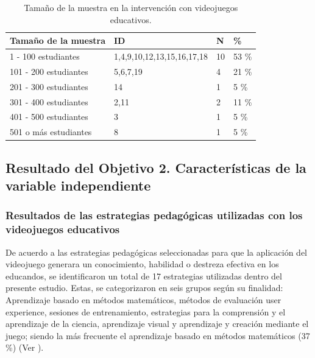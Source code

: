 \documentclass[spanish]{textolivre}
\begin{document}
\begin{table}[htbp]
\caption{Tamaño de la muestra en la intervención con videojuegos educativos.}
\label{tbl3}
\centering
\begin{tabular}{l l l l}
\toprule 
\textbf{Tamaño de la muestra} & \textbf{ID} & \textbf{N} & \textbf{\%}
\\
\midrule
1 - 100 estudiantes & 1,4,9,10,12,13,15,16,17,18 & 10 & 53 \%
\\
101 - 200 estudiantes & 5,6,7,19 & 4 & 21 \%
\\
201 - 300 estudiantes & 14 & 1 & 5 \%
\\
301 - 400 estudiantes & 2,11 & 2 & 11 \%
\\
401 - 500 estudiantes & 3 & 1 & 5 \%
\\
501 o más estudiantes & 8 & 1 & 5 \%
\\
\bottomrule
\end{tabular}
\end{table}


\subsection{Resultado del Objetivo 2. Características de la variable independiente}\label{sec-organizacao}

\subsubsection{Resultados de las estrategias pedagógicas utilizadas con los videojuegos educativos}
De acuerdo a las estrategias pedagógicas seleccionadas para que la aplicación del videojuego generara un conocimiento, habilidad o destreza efectiva en los educandos, se identificaron un total de 17 estrategias utilizadas dentro del presente estudio. Estas, se categorizaron en seis grupos según su finalidad: Aprendizaje basado en métodos matemáticos, métodos de evaluación user experience, sesiones de entrenamiento, estrategias para la comprensión y el aprendizaje de la ciencia, aprendizaje visual y aprendizaje y creación mediante el juego; siendo la más frecuente el aprendizaje basado en métodos matemáticos (37 \%) (Ver ).
\end{document}
